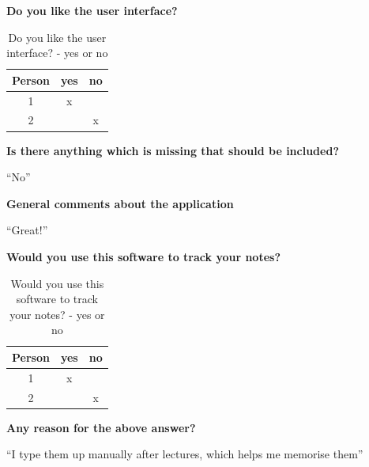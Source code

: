 \noindent
\textbf{Do you like the user interface?}
\begin{table}[h!]
\centering
 \begin{tabular}{||c c c||}
 \hline
   Person & yes & no \\ [0.5ex]
 \hline\hline
    1 & x &  \\
    2 & & x  \\
 \hline
  \end{tabular}
  \caption{Do you like the user interface? - yes or no}
\end{table}

\noindent
\textbf{Is there anything which is missing that should be included?}

``No''

\noindent
\textbf{General comments about the application}

``Great!''

\noindent
\textbf{Would you use this software to track your notes?}
\begin{table}[h!]
\centering
 \begin{tabular}{||c c c||}
 \hline
   Person & yes & no \\ [0.5ex]
 \hline\hline
    1 & x &  \\
    2 & & x  \\
 \hline
  \end{tabular}
  \caption{Would you use this software to track your notes? - yes or no}
\end{table}

\noindent
\textbf{Any reason for the above answer?}

``I type them up manually after lectures, which helps me memorise them''
